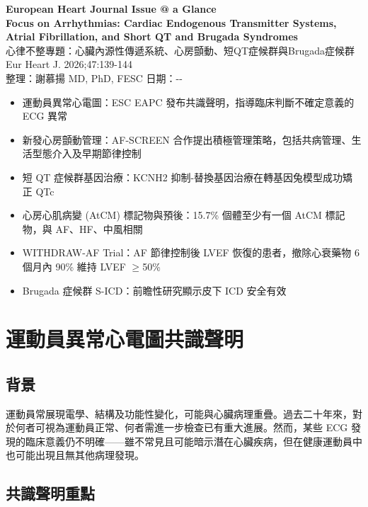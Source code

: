 \documentclass[12pt,a4paper]{article}
\newcommand{\keyfinding}[1]{
    \par
    \noindent
    \begin{tcolorbox}[
        colback=yellow!10!white,
        colframe=orange!75!black,
        title=\textbf{核心發現摘要},
        fonttitle=\bfseries,
        boxrule=0.5pt,
        arc=3pt
    ]
    #1
    \end{tcolorbox}
}
\newcommand{\mydate}{\the\year-\the\month-\the\day}
\begin{document}
\begin{center}
{\LARGE\bfseries\textcolor{emergency_red}{European Heart Journal Issue @ a Glance}}\\[0.5cm]
{\Large\textbf{Focus on Arrhythmias: Cardiac Endogenous Transmitter Systems, Atrial Fibrillation, and Short QT and Brugada Syndromes}}\\[0.3cm]
{\large 心律不整專題：心臟內源性傳遞系統、心房顫動、短QT症候群與Brugada症候群}\\[0.5cm]
{\normalsize Eur Heart J. 2026;47:139-144}\\[0.3cm]
{\normalsize 整理：謝慕揚 MD, PhD, FESC \quad 日期：\mydate}
\end{center}

\vspace{0.5cm}

\keyfinding{
\begin{itemize}[leftmargin=*]
    \item 運動員異常心電圖：ESC EAPC 發布共識聲明，指導臨床判斷不確定意義的 ECG 異常
    \item 新發心房顫動管理：AF-SCREEN 合作提出積極管理策略，包括共病管理、生活型態介入及早期節律控制
    \item 短 QT 症候群基因治療：KCNH2 抑制-替換基因治療在轉基因兔模型成功矯正 QTc
    \item 心房心肌病變 (AtCM) 標記物與預後：15.7\% 個體至少有一個 AtCM 標記物，與 AF、HF、中風相關
    \item WITHDRAW-AF Trial：AF 節律控制後 LVEF 恢復的患者，撤除心衰藥物 6 個月內 90\% 維持 LVEF $\geq$50\%
    \item Brugada 症候群 S-ICD：前瞻性研究顯示皮下 ICD 安全有效
\end{itemize}
}

\section{運動員異常心電圖共識聲明}

\subsection{背景}

運動員常展現電學、結構及功能性變化，可能與心臟病理重疊。過去二十年來，對於何者可視為運動員正常、何者需進一步檢查已有重大進展。然而，某些 ECG 發現的臨床意義仍不明確——雖不常見且可能暗示潛在心臟疾病，但在健康運動員中也可能出現且無其他病理發現。

\subsection{共識聲明重點}
\end{document}

